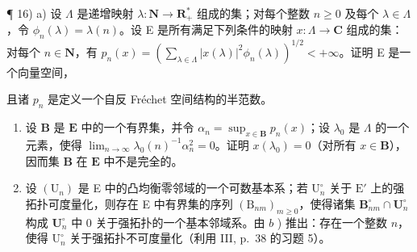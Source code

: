 ¶ 16) a) 设 \(\Lambda\) 是递增映射 \(\lambda : \mathbf{N} \to \mathbf{R}_{+}^{*}\) 组成的集；对每个整数 \(n \geqslant 0\) 及每个 \(\lambda \in \Lambda\)，令 \(\phi_{n}(\lambda) = \lambda(n)\)。设 E 是所有满足下列条件的映射 \(x: \Lambda \to \mathbf{C}\) 组成的集：对每个 \(n \in \mathbf{N}\)，有 \(p_{n}(x) = \left( \sum_{\lambda \in \Lambda} |x(\lambda)|^{2} \phi_{n}(\lambda) \right)^{1/2} < +\infty\)。证明 E 是一个向量空间，

且诸 \(p_{n}\) 是定义一个自反 Fréchet 空间结构的半范数。

\begin{enumerate}
\def\labelenumi{\alph{enumi})}
\setcounter{enumi}{1}
\item
  设 \(\mathbf{B}\) 是 \(\mathbf{E}\) 中的一个有界集，并令 \(\alpha_{n} = \sup_{x\in \mathbf{B}}p_{n}(x)\)；设 \(\lambda_0\) 是 \(\Lambda\) 的一个元素，使得 \(\lim_{n\to \infty}\lambda_0(n)^{-1}\alpha_n^2 = 0\)。证明 \(x(\lambda_0) = 0\)（对所有 \(x\in \mathbf{B}\)），因而集 \(\mathbf{B}\) 在 \(\mathbf{E}\) 中不是完全的。
\item
  设 \((\mathrm{U}_n)\) 是 E 中的凸均衡零邻域的一个可数基本系；若 \(\mathrm{U}_n^\circ\) 关于 \(\mathrm{E}'\) 上的强拓扑可度量化，则存在 E 中有界集的序列 \((\mathrm{B}_{nm})_{m\geqslant 0}\)，使得诸集 \(\mathbf{B}_{nm}^{\circ}\cap \mathbf{U}_n^\circ\) 构成 \(\mathbf{U}_n^\circ\) 中 0 关于强拓扑的一个基本邻域系。由 \(b\) ) 推出：存在一个整数 \(n\)，使得 \(\mathrm{U}_n^\circ\) 关于强拓扑不可度量化（利用 III, p.~38 的习题 5）。
\end{enumerate}

